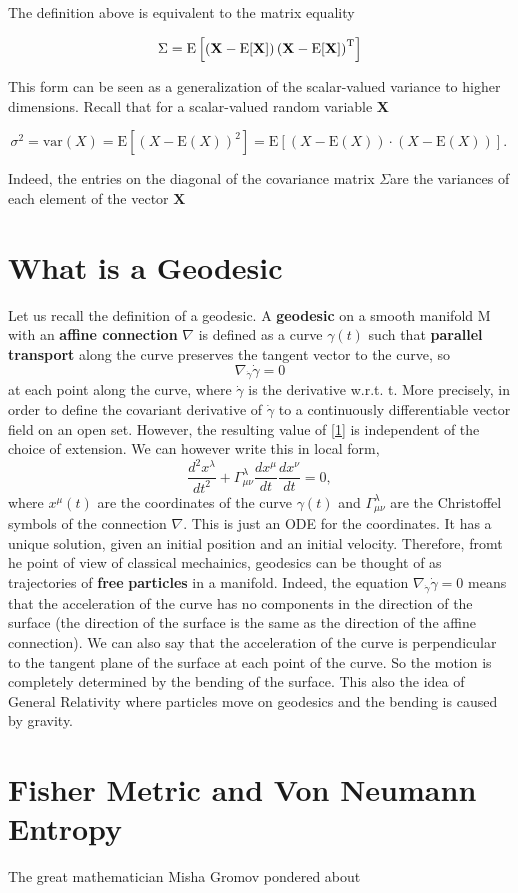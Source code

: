 The definition above is equivalent to the matrix equality

\begin{equation*}
\Sigma=\mathrm{E}
\left[
 \left(
 \textbf{X} - \mathrm{E}[\textbf{X}]
 \right)
 \left(
 \textbf{X} - \mathrm{E}[\textbf{X}]
 \right)^{\rm T}
\right]
\end{equation*}

This form can be seen as a generalization of the scalar-valued variance to higher dimensions.  
Recall that for a scalar-valued random variable \textbf{X}

\begin{equation*}
\sigma^2 = \mathrm{var}(X)
= \mathrm{E}[(X-\mathrm{E}(X))^2] = \mathrm{E}[(X-\mathrm{E}(X))\cdot(X-\mathrm{E}(X))].\,
\end{equation*}

Indeed, the entries on the diagonal of the covariance matrix $\Sigma$are the variances of each element of the 
vector $\mathbf{X}$
   \section{What is a Geodesic}
 Let us recall the definition of a geodesic. 
 A \textbf{geodesic} on a smooth manifold M with an \textbf{affine connection} $\nabla$ is defined as a curve 
 $\gamma(t)$ such that \textbf{parallel transport} along the curve preserves the tangent vector to the curve, so 
 \begin{equation}\label{1}
  \nabla_{\dot{\gamma}} \dot{\gamma} = 0
 \end{equation}
at each point along the curve, where $\dot{\gamma}$ is the derivative w.r.t. t. More precisely, in order to define the 
covariant derivative of $\dot{\gamma}$ to a continuously differentiable vector field on an open set. 
However, the resulting value of \ref{1} is independent of the choice of extension.
    We can however write this in local form, 
    \begin{equation*}
     \dfrac{d^{2} x^{\lambda}}{dt^2} + \Gamma_{\mu \nu}^{\lambda} \dfrac{dx^{\mu}}{dt} \dfrac{dx^{\nu}}{dt} = 0,
    \end{equation*}
where $x^{\mu}(t)$ are the coordinates of the curve $\gamma(t)$ and $\Gamma_{\mu \nu}^{\lambda}$ are the Christoffel
symbols of the connection $\nabla$. This is just an ODE for the coordinates. It has a unique solution, given an
initial position and an initial velocity. Therefore, fromt he point of view of classical mechainics, geodesics can 
be thought of as trajectories of \textbf{free} \textbf{particles} in a manifold. Indeed, the equation 
$\nabla_{\dot{\gamma}}\dot{\gamma} = 0$ means that the acceleration of the curve has no components in the direction 
of the surface (the direction of the surface is the same as the direction of the affine connection). We can also 
say that the acceleration of the curve is perpendicular to the tangent plane of the surface at each point of the
curve. So the motion is completely determined by the bending of the surface. This also the idea of General Relativity where
particles move on geodesics and the bending is caused by gravity. 
 \section{Fisher Metric and Von Neumann Entropy}
 The great mathematician Misha Gromov pondered about 

